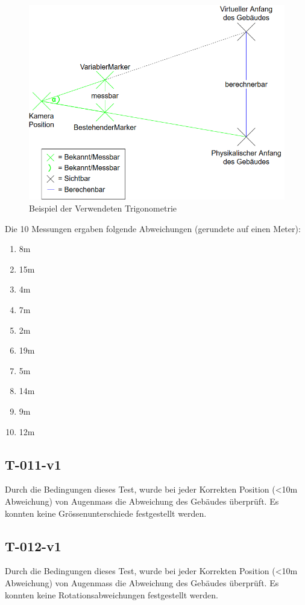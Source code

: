 \documentclass[a4paper]{scrreprt}
\begin{document}
\begin{figure}[h!]
	\center
	\includegraphics[keepaspectratio, width=\textwidth / 2]{TrigonometrieBeispiel.png}
	\caption{Beispiel der Verwendeten Trigonometrie}
	\label{fig:TrigometrieBeispiel}
\end{figure}

Die 10 Messungen ergaben folgende Abweichungen (gerundete auf einen Meter):
\begin{enumerate}
	\item 8m
	\item 15m
	\item 4m
	\item 7m
	\item 2m
	\item 19m
	\item 5m
	\item 14m
	\item 9m
	\item 12m
\end{enumerate}
\subsection*{T-011-v1}
Durch die Bedingungen dieses Test, wurde bei jeder Korrekten Position (<10m Abweichung) von Augenmass die Abweichung des Gebäudes überprüft. Es konnten keine Grössenunterschiede festgestellt werden.
\subsection*{T-012-v1}
Durch die Bedingungen dieses Test, wurde bei jeder Korrekten Position (<10m Abweichung) von Augenmass die Abweichung des Gebäudes überprüft. Es konnten keine Rotationsabweichungen festgestellt werden.
\end{document}
